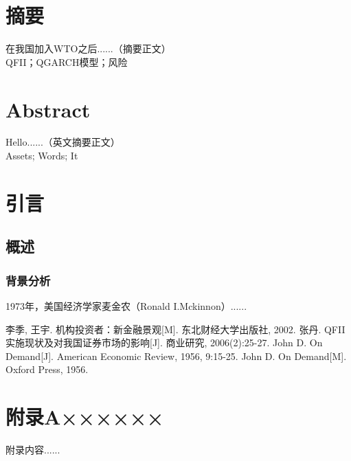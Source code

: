 \documentclass[UTF8,a4paper]{ctexart}
\begin{document}
\newpage
\clearpage
{} %
\setcounter{page}{1}   %
\section*{摘\quad 要}
\begin{spacing}{1.5}
{\songti{}
在我国加入WTO之后......（摘要正文）\\[1em]

 QFII；QGARCH模型；风险}
\end{spacing}

\newpage
\section*{Abstract}
\begin{spacing}{1.5}
{\rmfamily{}
Hello......（英文摘要正文）\\[1em]

 Assets; Words; It}
\end{spacing}

\newpage
\tableofcontents

\newpage
\clearpage
{} %
\setcounter{page}{1}   %
\section{引言}
\subsection{概述}
\subsubsection{背景分析}
1973年，美国经济学家麦金农（Ronald I.Mckinnon）......

\newpage
\begin{thebibliography}{99}
 李季, 王宇. 机构投资者：新金融景观[M]. 东北财经大学出版社, 2002.
 张丹. QFII实施现状及对我国证券市场的影响[J]. 商业研究, 2006(2):25-27.
 John D. On Demand[J]. American Economic Review, 1956, 9:15-25.
 John D. On Demand[M]. Oxford Press, 1956.
\end{thebibliography}

\newpage
\section*{附\quad 录A\quad ××××××}
附录内容......
\end{document}
